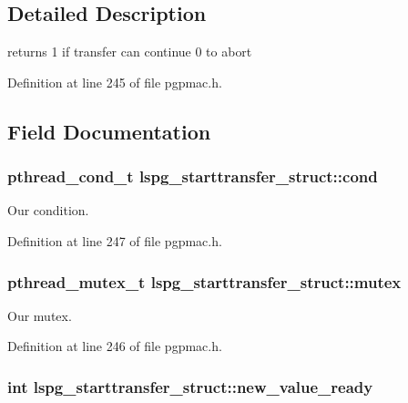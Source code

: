 \subsection{Detailed Description}
returns 1 if transfer can continue 0 to abort 

Definition at line 245 of file pgpmac.\-h.



\subsection{Field Documentation}
\hypertarget{structlspg__starttransfer__struct_a1a569a2afabd7910219ff9d2d48c1b38}{
\subsubsection[{cond}]{\setlength{\rightskip}{0pt plus 5cm}pthread\-\_\-cond\-\_\-t lspg\-\_\-starttransfer\-\_\-struct\-::cond}}\label{structlspg__starttransfer__struct_a1a569a2afabd7910219ff9d2d48c1b38}


Our condition. 



Definition at line 247 of file pgpmac.\-h.

\hypertarget{structlspg__starttransfer__struct_a47824bb2701a699d43a7a916e2010705}{
\subsubsection[{mutex}]{\setlength{\rightskip}{0pt plus 5cm}pthread\-\_\-mutex\-\_\-t lspg\-\_\-starttransfer\-\_\-struct\-::mutex}}\label{structlspg__starttransfer__struct_a47824bb2701a699d43a7a916e2010705}


Our mutex. 



Definition at line 246 of file pgpmac.\-h.

\hypertarget{structlspg__starttransfer__struct_ad3a6356e5ccce15c982ddecf9634999f}{
\subsubsection[{new\-\_\-value\-\_\-ready}]{\setlength{\rightskip}{0pt plus 5cm}int lspg\-\_\-starttransfer\-\_\-struct\-::new\-\_\-value\-\_\-ready}}\label{structlspg__starttransfer__struct_ad3a6356e5ccce15c982ddecf9634999f}



